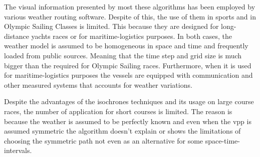 The visual information presented by most these algorithms has been employed by various weather routing software. Despite of this, the use of them in sports and in Olympic Sailing Classes is limited. This because they are designed for long-distance yachts races or for maritime-logistics purposes. In both cases, the weather model is assumed to be homogeneous in space and time and frequently loaded from public sources. Meaning that the time step and grid size is much bigger than the required for Olympic Sailing races. Furthermore, when it is used for maritime-logistics purposes the vessels are equipped with communication and other measured systems that accounts for weather variations. \par
Despite the advantages of the isochrones techniques and its usage on large course races, the number of application for short courses is limited. The reason is because the weather is assumed to be perfectly known and even when the \acrshort{vpp} is assumed symmetric the algorithm doesn't explain or shows the limitations of choosing the symmetric path not even as an alternative for some space-time-intervals.\par    

